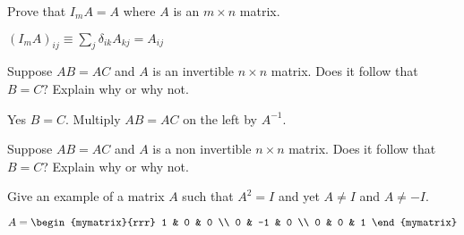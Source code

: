 \begin{enumialphparenastyle}

\begin{ex} Prove that $I_{m}A=A$ where $A$ is an $m\times n$ matrix.
\begin{sol}
 $\left(
I_{m}A\right) _{ij}\equiv \sum_{j}\delta _{ik}A_{kj}=A_{ij}$
\end{sol}
\end{ex}

\begin{ex} Suppose $AB=AC$ and $A$ is an invertible $n\times n$ matrix. Does it
follow that $B=C?$ Explain why or why not. 
\begin{sol}
Yes $B=C$. Multiply $AB = AC$ on the left by $A^{-1}$. 
\end{sol}
\end{ex}

\begin{ex} Suppose $AB=AC$ and $A$ is a non invertible $n\times n$ matrix. Does it follow that $B=C$? Explain why or why not.  
\end{ex}

\begin{ex} Give an example of a matrix $A$ such that $A^{2}=I$ and yet $A\neq I$
and $A\neq -I.$ 
\begin{sol}
$A = \begin{mymatrix}{rrr}
1 & 0 & 0 \\
0 & -1 & 0 \\
0 & 0 & 1
\end{mymatrix} $
\end{sol}
\end{ex}

\end{enumialphparenastyle}